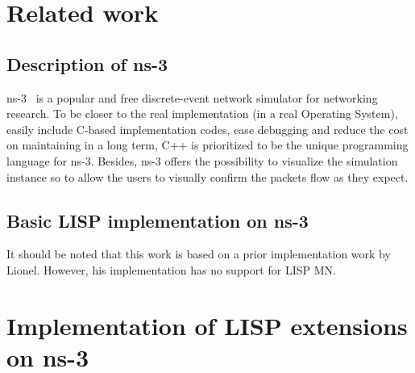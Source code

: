 \section{Related work}
\label{sec:ns3_related_work}
 \subsection{Description of ns-3}
 \label{sec:ns3_ns3}
 ns-3~\cite{ns3} is a popular and free discrete-event network simulator for networking research. To be closer to the real implementation (in a real Operating System), easily include C-based implementation codes, ease debugging and reduce the cost on maintaining in a long term, C++ is prioritized to be the unique programming language for ns-3. Besides, ns-3 offers the possibility to visualize the simulation instance so to allow the users to visually confirm the packets flow as they expect.

\subsection{Basic LISP implementation on ns-3}
\label{sec:ns3_basic_lisp}
It should be noted that this work is based on a prior implementation work by Lionel. However, his implementation has no support for LISP MN.


\section{Implementation of LISP extensions on ns-3}
\label{sec:ns3_lispmn}

